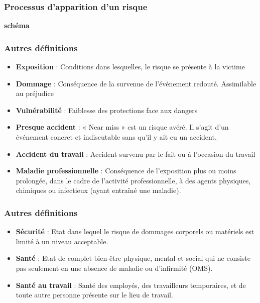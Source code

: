 \documentclass{beamer}
\begin{document}
\begin{frame}
\frametitle{Processus d’apparition d’un risque}

\textbf{schéma}
\end{frame}


\begin{frame}
\frametitle{Autres définitions}
\begin{itemize}
\item \textbf{Exposition} : Conditions dans lesquelles, le risque se présente à la victime

\item \textbf{Dommage} : Conséquence de la survenue de l’événement redouté. Assimilable au préjudice

\item \textbf{Vulnérabilité} : Faiblesse des protections face aux dangers

\item \textbf{Presque accident} : « Near miss » est un risque avéré. Il s’agit d’un événement concret et indiscutable sans qu’il y ait eu un accident.

\item \textbf{Accident du travail} : Accident survenu par le fait ou à l’occasion du travail

\item \textbf{Maladie professionnelle} : Conséquence de l’exposition plus ou moins prolongée, dans le cadre de l’activité professionnelle, à des agents physiques, chimiques ou infectieux (ayant entraîné une maladie).
\end{itemize}
\end{frame}

\begin{frame}
\frametitle{Autres définitions}
\begin{itemize}
\item \textbf{Sécurité} : Etat dans lequel le risque de dommages corporels ou matériels est limité à un niveau acceptable.

\item \textbf{Santé} : Etat de complet bien-être physique, mental et social qui ne consiste pas seulement en une absence de maladie ou d’infirmité (OMS).

\item \textbf{Santé au travail} : Santé des employés, des travailleurs temporaires, et de toute autre personne présente sur le lieu de travail.
\end{itemize}
\end{frame}
\end{document}
